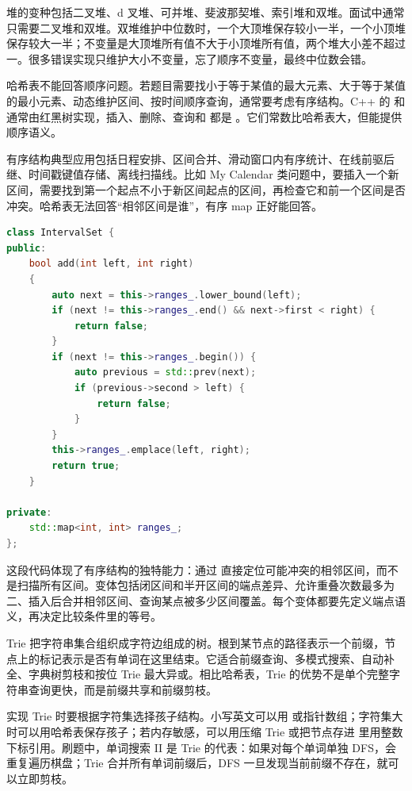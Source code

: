 堆的变种包括二叉堆、d 叉堆、可并堆、斐波那契堆、索引堆和双堆。面试中通常只需要二叉堆和双堆。双堆维护中位数时，一个大顶堆保存较小一半，一个小顶堆保存较大一半；不变量是大顶堆所有值不大于小顶堆所有值，两个堆大小差不超过一。很多错误实现只维护大小不变量，忘了顺序不变量，最终中位数会错。


哈希表不能回答顺序问题。若题目需要找小于等于某值的最大元素、大于等于某值的最小元素、动态维护区间、按时间顺序查询，通常要考虑有序结构。C++ 的  和  通常由红黑树实现，插入、删除、查询和  都是 。它们常数比哈希表大，但能提供顺序语义。

有序结构典型应用包括日程安排、区间合并、滑动窗口内有序统计、在线前驱后继、时间戳键值存储、离线扫描线。比如 My Calendar 类问题中，要插入一个新区间，需要找到第一个起点不小于新区间起点的区间，再检查它和前一个区间是否冲突。哈希表无法回答“相邻区间是谁”，有序 map 正好能回答。

\begin{lstlisting}[language=C++,caption={有序 map 维护互不重叠区间}]
class IntervalSet {
public:
    bool add(int left, int right)
    {
        auto next = this->ranges_.lower_bound(left);
        if (next != this->ranges_.end() && next->first < right) {
            return false;
        }
        if (next != this->ranges_.begin()) {
            auto previous = std::prev(next);
            if (previous->second > left) {
                return false;
            }
        }
        this->ranges_.emplace(left, right);
        return true;
    }

private:
    std::map<int, int> ranges_;
};
\end{lstlisting}

这段代码体现了有序结构的独特能力：通过  直接定位可能冲突的相邻区间，而不是扫描所有区间。变体包括闭区间和半开区间的端点差异、允许重叠次数最多为二、插入后合并相邻区间、查询某点被多少区间覆盖。每个变体都要先定义端点语义，再决定比较条件里的等号。


Trie 把字符串集合组织成字符边组成的树。根到某节点的路径表示一个前缀，节点上的标记表示是否有单词在这里结束。它适合前缀查询、多模式搜索、自动补全、字典树剪枝和按位 Trie 最大异或。相比哈希表，Trie 的优势不是单个完整字符串查询更快，而是前缀共享和前缀剪枝。

实现 Trie 时要根据字符集选择孩子结构。小写英文可以用  或指针数组；字符集大时可以用哈希表保存孩子；若内存敏感，可以用压缩 Trie 或把节点存进  里用整数下标引用。刷题中，单词搜索 II 是 Trie 的代表：如果对每个单词单独 DFS，会重复遍历棋盘；Trie 合并所有单词前缀后，DFS 一旦发现当前前缀不存在，就可以立即剪枝。

